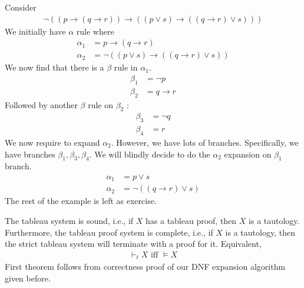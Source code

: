 \documentclass[a4paper]{article}
\theoremstyle{plain}
\newtheorem{thm}{Theorem}[section]
\theoremstyle{definition}
\newtheorem{exmp}{Example}[section]
\theoremstyle{remark}
\begin{document}
\begin{tcolorbox}[colback=black!3!white,colframe=black!60!white,title=\begin{exmp}Semantic Tableau Example \label{Semantic Tableau Example}\end{exmp}]
        Consider
                \begin{align}
                \neg (( p \to (q \to r)) \to ((p \lor s) \to ((q\to r) \lor s)))
                \end{align}
		We initially have $\alpha$ rule where
		\begin{align}
			\alpha_1 &= p \to \left( q \to r \right) \\
			\alpha_2 &= \neg (( p \lor s) \to (( q\to r) \lor s ))
		\end{align}
		We now find that there is a $\beta$ rule in $\alpha_1$.
		\begin{align}
			\beta_1 &= \neg p \\
			\beta_2 & = q \to  r
		\end{align}
		Followed by another $\beta$ rule on $\beta_2$ :
		\begin{align}
			\beta_3 &= \neg q \\
			\beta_4 &= r
		\end{align}
		We now require to expand $\alpha_2$. However, we have lots of branches. Specifically, we have branches $\beta_1, \beta_3, \beta_4$. We will blindly decide to do the $\alpha_2$ expansion on $\beta_1$ branch.
		\begin{align}
			\alpha_1 &= p \lor s\\
			\alpha_2 &= \neg ((q \to r ) \lor s) 
		\end{align}
		The rest of the example is left as exercise.
\end{tcolorbox}
\begin{tcolorbox}[colback=black!3!white,colframe=black!60!white,title=\begin{thm}Soundness and Completeness \label{Soundness and Completeness}\end{thm}]
	The tableau system is sound, i.e., if $X$ has a tableau proof, then $X$ is a tautology. Furthermore, the tableau proof system is complete, i.e., if $X$ is a tautology, then the strict tableau system will terminate with a proof for it. Equivalent,
		\begin{align}
		\vdash_t X \text{ iff } \vDash X
		\end{align}
		First theorem follows from correctness proof of our DNF expansion algorithm given before. 
\end{tcolorbox}
\end{document}

